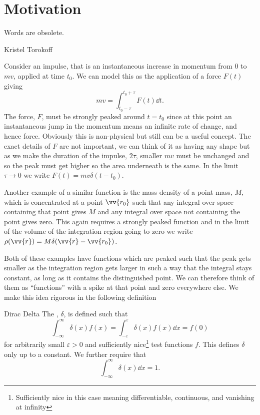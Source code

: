 \documentclass[fleqn]{NotesClass}
\begin{document}
    \section{Motivation}
    \epigraph{Words are obsolete.}{Kristel Torokoff}
    Consider an impulse, that is an instantaneous increase in momentum from 0 to \(mv\), applied at time \(t_0\).
    We can model this as the application of a force \(F(t)\) giving
    \begin{equation}
        mv = \int_{t_0-\tau}^{t_0 + \tau} F(t) \dd{t}.
    \end{equation}
    The force, \(F\), must be strongly peaked around \(t = t_0\) since at this point an instantaneous jump in the momentum means an infinite rate of change, and hence force.
    Obviously this is non-physical but still can be a useful concept.
    The exact details of \(F\) are not important, we can think of it as having any shape but as we make the duration of the impulse, \(2\tau\), smaller \(mv\) must be unchanged and so the peak must get higher so the area underneath is the same.
    In the limit \(\tau \to 0\) we write \(F(t) = mv\delta(t - t_0)\).
    
    Another example of a similar function is the mass density of a point mass, \(M\), which is concentrated at a point \(\vv{r_0}\) such that any integral over space containing that point gives \(M\) and any integral over space not containing the point gives zero.
    This again requires a strongly peaked function and in the limit of the volume of the integration region going to zero we write \(\rho(\vv{r}) = M\delta(\vv{r} - \vv{r_0})\).
    
    Both of these examples have functions which are peaked such that the peak gets smaller as the integration region gets larger in such a way that the integral stays constant, as long as it contains the distinguished point.
    We can therefore think of them as \enquote{functions} with a spike at that point and zero everywhere else.
    We make this idea rigorous in the following definition
    
    \begin{dfn}{Dirac Delta}{}
        The , \(\delta\), is defined such that
        \begin{equation}
            \int_{-\infty}^{\infty} \delta(x) f(x) = \int_{-\varepsilon}^{\varepsilon} \delta(x)f(x) \dd{x} = f(0)
        \end{equation}
        for arbitrarily small \(\varepsilon > 0\) and sufficiently nice\footnote{Sufficiently nice in this case meaning differentiable, continuous, and vanishing at infinity} test functions \(f\).
        This defines \(\delta\) only up to a constant.
        We further require that
        \begin{equation}
            \int_{-\infty}^{\infty} \delta(x) \dd{x} = 1.
        \end{equation}
    \end{dfn}
    
\end{document}
